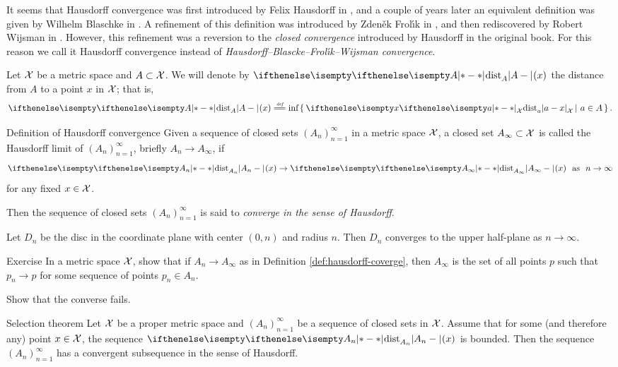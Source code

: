 It seems that Hausdorff convergence was first introduced by Felix Hausdorff in \cite{hausdorff},
and a couple of years later an equivalent definition was given by Wilhelm Blaschke in \cite{blaschke}.
A refinement of this definition was introduced by  Zden\v{e}k Frol\'{\i}k in \cite{frolik},
and then rediscovered by Robert Wijsman in \cite{wijsman}.  
However, this refinement was a reversion  to  the {}\emph{closed convergence} introduced by Hausdorff in the original book. 
For this reason we call it Hausdorff convergence
instead of
{}\emph{Hausdorff--Blascke--Frol\'{\i}k--Wijsman convergence}.


Let $\mathcal{X}$ be a metric space and $A\subset \spc{X}$.
We will denote by $\dist{A}{}{}(x)$ the distance from $A$ to a point $x$ in $\mathcal{X}$;
that is,
$$\dist{A}{}{}(x)\df\inf\set{\dist{a}{x}{\spc{X}}}{a\in A}.$$

\begin{thm}{Definition of Hausdorff convergence}\label{def:hausdorff-coverge}
Given a sequence of closed sets $(A_n)_{n=1}^\infty$ in a metric space $\mathcal{X}$, 
a closed set $A_\infty\subset \spc{X}$ is called the Hausdorff limit of $(A_n)_{n=1}^\infty$,
briefly $A_n\to A_\infty$, if 
$$\dist{A_n}{}{}(x)\to\dist{A_\infty}{}{}(x)\ \ \t{as}\ \ n\to\infty$$
for any fixed $x\in \spc{X}$.

Then the sequence of closed sets $(A_n)_{n=1}^\infty$ is said to \emph{converge in the sense of Hausdorff}.
\end{thm}

Let $D_n$ be the disc in the coordinate plane 
with center $(0,n)$ and radius $n$.
Then $D_n$ converges to the upper half-plane as $n\to\infty$. 

\begin{thm}{Exercise}\label{ex:hausdorff-conv}
In a  metric space $\mathcal{X}$, show that if $A_n\to A_\infty$ as in Definition \ref{def:hausdorff-coverge}, then $A_\infty$ is the set of all points $p$ such that   $p_n\to p$ for some sequence of points  $p_n\in A_n$.

Show that the converse fails.
\end{thm}

\begin{thm}{Selection theorem}
Let $\mathcal{X}$ be a proper metric space
and $(A_n)_{n=1}^\infty$ be a sequence of closed sets in $\mathcal{X}$.
Assume that for some (and therefore any) point  $x\in\spc{X}$, 
the sequence $\dist{A_n}{}{}(x)$ is bounded.
Then the sequence  $(A_n)_{n=1}^\infty$ has a convergent subsequence in the sense of Hausdorff.
\end{thm}

